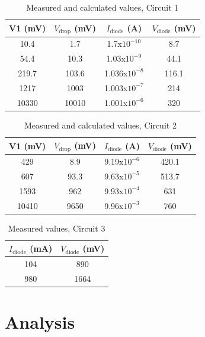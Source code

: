\documentclass[12pt,letterpaper]{report}
\begin{document}
\begin{table}[ht]
\caption{Measured and calculated values, Circuit 1} %
\centering 
    \begin{tabular}{| c | c | c | c |}
    \hline  
    V1 (mV) & $V_{\text{drop}}$ (mV) & $I_{\text{diode}}$ (A) & $V_{\text{diode}}$ (mV) \\
    \hline
    10.4 & 1.7 & 1.7x$10^{-10}$ & 8.7 \\
    54.4 & 10.3 & 1.03x$10^{-9}$ & 44.1\\
    219.7 & 103.6 & 1.036x$10^{-8}$ & 116.1\\
    1217 & 1003 & 1.003x$10^{-7}$ & 214\\
    10330 & 10010 & 1.001x$10^{-6}$ & 320\\
    \hline
    \end{tabular}
    \label{table:circuit_1}
\end{table}

\begin{table}[ht]
\caption{Measured and calculated values, Circuit 2} %
\centering 
    \begin{tabular}{| c | c | c | c |}
    \hline  
    V1 (mV) & $V_{\text{drop}}$ (mV) & $I_{\text{diode}}$ (A) & $V_{\text{diode}}$ (mV) \\
    \hline
    429 & 8.9 & 9.19x$10^{-6}$ & 420.1 \\
    607 & 93.3 & 9.63x$10^{-5}$ & 513.7\\
    1593 & 962 & 9.93x$10^{-4}$ & 631\\
    10410 & 9650 & 9.96x$10^{-3}$ & 760\\
    \hline
    \end{tabular}
    \label{table:circuit_2}
\end{table}

\begin{table}[ht]
\caption{Measured values, Circuit 3} %
\centering 
    \begin{tabular}{| c | c |}
    \hline  
    $I_{\text{diode}}$ (mA) & $V_{\text{diode}}$ (mV) \\
    \hline
    104 & 890 \\
    980 & 1664\\
    \hline
    \end{tabular}
    \label{table:circuit_3}
\end{table}

\section*{Analysis}
\end{document}
